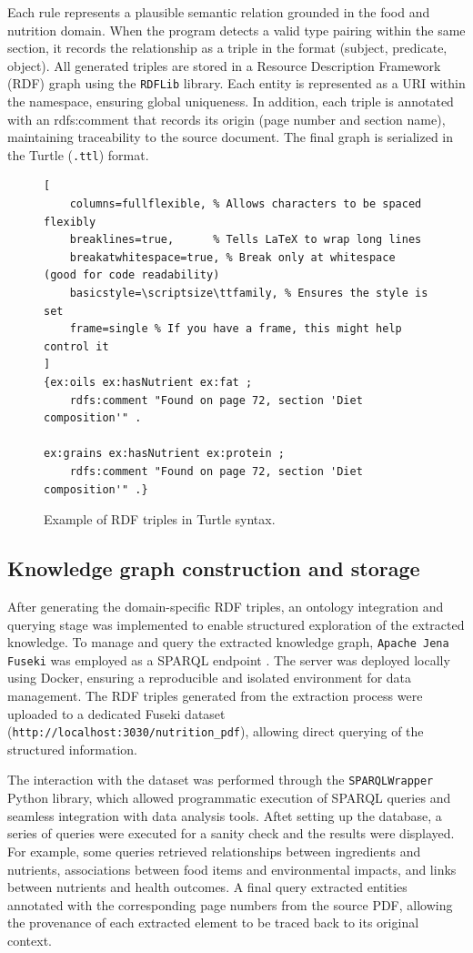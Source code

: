 Each rule represents a plausible semantic relation grounded in the food and nutrition domain. When the program detects a valid type pairing within the same section, it records the relationship as a triple in the format (subject, predicate, object). 
All generated triples are stored in a Resource Description Framework (RDF) graph using the \texttt{RDFLib} library. Each entity is represented as a URI within the namespace, ensuring global uniqueness. In addition, each triple is annotated with an rdfs:comment that records its origin (page number and section name), maintaining traceability to the source document. The final graph is serialized in the Turtle (\texttt{.ttl}) format.
\begin{figure}[h!]
\centering
\scriptsize
\begin{lstlisting}[
    columns=fullflexible, % Allows characters to be spaced flexibly
    breaklines=true,      % Tells LaTeX to wrap long lines
    breakatwhitespace=true, % Break only at whitespace (good for code readability)
    basicstyle=\scriptsize\ttfamily, % Ensures the style is set
    frame=single % If you have a frame, this might help control it
]
{ex:oils ex:hasNutrient ex:fat ;
    rdfs:comment "Found on page 72, section 'Diet composition'" .

ex:grains ex:hasNutrient ex:protein ;
    rdfs:comment "Found on page 72, section 'Diet composition'" .}
\end{lstlisting}
\caption{Example of RDF triples in Turtle syntax.}
\label{fig:triples_example}
\end{figure}

\subsection{Knowledge graph construction and storage}
After generating the domain-specific RDF triples, an ontology integration and querying stage was implemented to enable structured exploration of the extracted knowledge. To manage and query the extracted knowledge graph, \texttt{Apache Jena Fuseki} was employed as a SPARQL endpoint \cite{apache_jena}. The server was deployed locally using Docker, ensuring a reproducible and isolated environment for data management. The RDF triples generated from the extraction process were uploaded to a dedicated Fuseki dataset (\texttt{http://localhost:3030/nutrition\_pdf}), allowing direct querying of the structured information.

The interaction with the dataset was performed through the \texttt{SPARQLWrapper} Python library, which allowed programmatic execution of SPARQL queries and seamless integration with data analysis tools. Aftet setting up the database, a series of queries were executed for a sanity check and the results were displayed. For example, some queries retrieved relationships between ingredients and nutrients, associations between food items and environmental impacts, and links between nutrients and health outcomes. A final query extracted entities annotated with the corresponding page numbers from the source PDF, allowing the provenance of each extracted element to be traced back to its original context.

